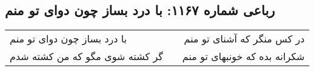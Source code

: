 \begin{center}
\section*{رباعی شماره ۱۱۶۷: با درد بساز چون دوای تو منم}
\label{sec:1167}
\begin{longtable}{l p{0.5cm} r}
با درد بساز چون دوای تو منم
&&
در کس منگر که آشنای تو منم
\\
گر کشته شوی مگو که من کشته شدم
&&
شکرانه بده که خونبهای تو منم
\\
\end{longtable}
\end{center}
